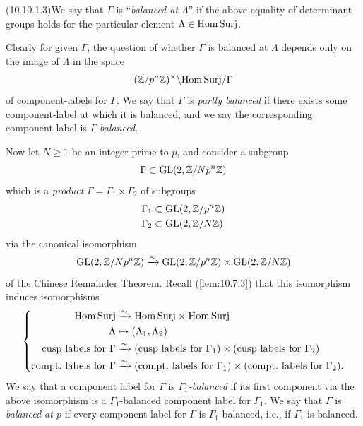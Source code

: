 \par{}\noindent{}\label{item:10.10.1.3}(10.10.1.3)\enspace We say that $\Gamma$ is ``\emph{balanced at $\Lambda$}'' if the above equality of determinant groups holds for the particular element $\Lambda \in \mathrm{Hom\,Surj}$.
\par
Clearly for given $\Gamma$, the question of whether $\Gamma$ is balanced at $\Lambda$ depends only on the image of $\Lambda$ in the space
\[
(\mathbb{Z}/p^n\mathbb{Z})^\times \backslash \mathrm{Hom\,Surj}/\Gamma
\]
of component-labels for $\Gamma$. We say that $\Gamma$ is \emph{partly balanced} if there exists some component-label at which it is balanced, and we say the corresponding component label is \emph{$\Gamma$-balanced}.

\kmitem\label{item:10.10.2}
Now let $N \ge 1$ be an integer prime to $p$, and consider a subgroup
\[
\Gamma \subset \operatorname{GL}(2, \mathbb{Z}/Np^n\mathbb{Z})
\]
which is a \emph{product} $\Gamma = \Gamma_1 \times \Gamma_2$ of subgroups
\begin{align*}
\Gamma_1 &\subset \operatorname{GL}(2, \mathbb{Z}/p^n\mathbb{Z}) \\
\Gamma_2 &\subset \operatorname{GL}(2, \mathbb{Z}/N\mathbb{Z})
\end{align*}
via the canonical isomorphism
\[
\operatorname{GL}(2, \mathbb{Z}/Np^n\mathbb{Z}) \xrightarrow{\sim} \operatorname{GL}(2, \mathbb{Z}/p^n\mathbb{Z}) \times \operatorname{GL}(2, \mathbb{Z}/N\mathbb{Z})
\]
of the Chinese Remainder Theorem. Recall (\ref{lem:10.7.3}) that this isomorphism induces isomorphisms
\[
\resizebox{0.95\linewidth}{!}{$\displaystyle
\left\{
\begin{aligned}
\HomSurj &\xrightarrow{\sim} \HomSurj \times \HomSurj \\
\Lambda &\mapsto (\Lambda_1, \Lambda_2) \\
\text{cusp labels for } \Gamma &\xrightarrow{\sim} (\text{cusp labels for } \Gamma_1) \times (\text{cusp labels for } \Gamma_2) \\
\text{compt.\ labels for } \Gamma &\xrightarrow{\sim} (\text{compt.\ labels for } \Gamma_1) \times (\text{compt.\ labels for } \Gamma_2) .
\end{aligned}
\right.
$}
\]
We say that a component label for $\Gamma$ is \emph{$\Gamma_1$-balanced} if its first component via the above isomorphism is a $\Gamma_1$-balanced component label for $\Gamma_1$. We say that $\Gamma$ is \emph{balanced at $p$} if every component label for $\Gamma$ is $\Gamma_1$-balanced, i.e., if $\Gamma_1$ is balanced.

